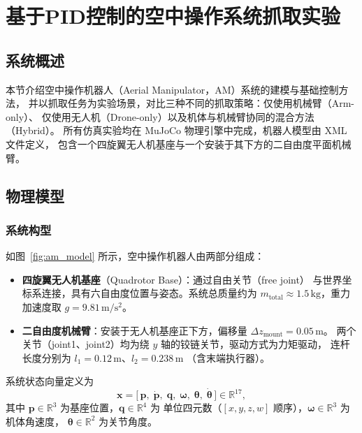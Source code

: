 
\section{基于PID控制的空中操作系统抓取实验}
\label{sec:pid_grasp}

\subsection{系统概述}

本节介绍空中操作机器人（Aerial Manipulator，AM）系统的建模与基础控制方法，
并以抓取任务为实验场景，对比三种不同的抓取策略：仅使用机械臂（Arm-only）、
仅使用无人机（Drone-only）以及机体与机械臂协同的混合方法（Hybrid）。
所有仿真实验均在 MuJoCo 物理引擎中完成，机器人模型由 XML 文件定义，
包含一个四旋翼无人机基座与一个安装于其下方的二自由度平面机械臂。

\subsection{物理模型}

\subsubsection{系统构型}

如图~\ref{fig:am_model} 所示，空中操作机器人由两部分组成：
\begin{itemize}
    \item \textbf{四旋翼无人机基座}（Quadrotor Base）：通过自由关节（free joint）
          与世界坐标系连接，具有六自由度位置与姿态。系统总质量约为
          $m_{\mathrm{total}} \approx 1.5\,\mathrm{kg}$，重力加速度取
          $g = 9.81\,\mathrm{m/s^2}$。
    \item \textbf{二自由度机械臂}：安装于无人机基座正下方，偏移量
          $\Delta z_{\mathrm{mount}} = 0.05\,\mathrm{m}$。
          两个关节（joint1、joint2）均为绕 $y$ 轴的铰链关节，驱动方式为力矩驱动，
          连杆长度分别为 $l_1 = 0.12\,\mathrm{m}$、$l_2 = 0.238\,\mathrm{m}$
          （含末端执行器）。
\end{itemize}

系统状态向量定义为
\begin{equation}
    \mathbf{x} = \bigl[\,\mathbf{p},\;\dot{\mathbf{p}},\;\mathbf{q},\;\boldsymbol{\omega},\;\boldsymbol{\theta},\;\dot{\boldsymbol{\theta}}\,\bigr]
    \in \mathbb{R}^{17},
\end{equation}
其中 $\mathbf{p}\in\mathbb{R}^3$ 为基座位置，$\mathbf{q}\in\mathbb{R}^4$ 为
单位四元数（$[x,y,z,w]$ 顺序），$\boldsymbol{\omega}\in\mathbb{R}^3$ 为机体角速度，
$\boldsymbol{\theta}\in\mathbb{R}^2$ 为关节角度。


